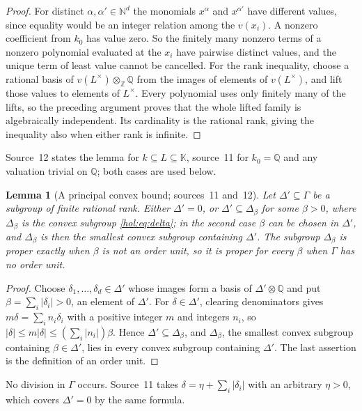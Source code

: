 \documentclass[11pt]{article}
\numberwithin{equation}{section}
\newtheorem{lemma}[theorem]{Lemma}
\theoremstyle{definition}
\theoremstyle{remark}
\newcommand{\Q}{\mathbb Q}
\newcommand{\N}{\mathbb N}
\newcommand{\Z}{\mathbb Z}
\newcommand{\abs}[1]{\lvert#1\rvert}
\newcommand{\KK}{\mathbb K}
\begin{document}
\begin{proof}
For distinct $\alpha,\alpha'\in\N^d$ the monomials $x^\alpha$ and
$x^{\alpha'}$ have different values, since equality would be an integer
relation among the $v(x_i)$. A nonzero coefficient from $k_0$ has value zero.
So the finitely many nonzero terms of a nonzero polynomial evaluated at the
$x_i$ have pairwise distinct values, and the unique term of least value
cannot be cancelled. For the rank inequality, choose a rational basis of
$v(L^\times)\otimes_\Z\Q$ from the images of elements of $v(L^\times)$,
and lift those values to elements of $L^\times$. Every polynomial uses only
finitely many of the lifts, so the preceding argument proves that the whole
lifted family is algebraically independent. Its cardinality is the rational
rank, giving the inequality also when either rank is infinite.
\end{proof}

Source~12 states the lemma for $k\subseteq L\subseteq\KK$, source~11 for
$k_0=\Q$ and any valuation trivial on $\Q$; both cases are used below.

\begin{lemma}[A principal convex bound; sources~11 and~12]
\label{hol:cf:lem:principal}
Let $\Delta'\subseteq\Gamma$ be a subgroup of finite rational rank. Either
$\Delta'=0$, or $\Delta'\subseteq\Delta_\beta$ for some $\beta>0$, where
$\Delta_\beta$ is the convex subgroup \eqref{hol:eq:delta}; in the second case
$\beta$ can be chosen in $\Delta'$, and $\Delta_\beta$ is then the smallest
convex subgroup containing $\Delta'$. The subgroup $\Delta_\beta$ is proper
exactly when $\beta$ is not an order unit, so it is proper for every $\beta$
when $\Gamma$ has no order unit.
\end{lemma}

\begin{proof}
Choose $\delta_1,\ldots,\delta_d\in\Delta'$ whose images form a basis of
$\Delta'\otimes\Q$ and put $\beta=\sum_i\abs{\delta_i}>0$, an element of
$\Delta'$. For $\delta\in\Delta'$, clearing denominators gives
$m\delta=\sum_in_i\delta_i$ with a positive integer $m$ and integers $n_i$,
so $\abs\delta\le m\abs\delta\le(\sum_i\abs{n_i})\beta$. Hence
$\Delta'\subseteq\Delta_\beta$, and $\Delta_\beta$, the smallest convex
subgroup containing $\beta\in\Delta'$, lies in every convex subgroup
containing $\Delta'$. The last assertion is the definition of an order unit.
\end{proof}

No division in $\Gamma$ occurs. Source~11 takes
$\delta=\eta+\sum_i\abs{\delta_i}$ with an arbitrary $\eta>0$, which covers
$\Delta'=0$ by the same formula.
\end{document}
